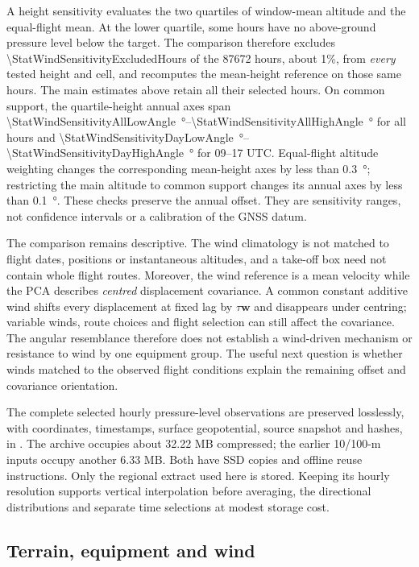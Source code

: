 A height sensitivity evaluates the two quartiles of window-mean altitude and
the equal-flight mean. At the lower quartile, some hours have no above-ground
pressure level below the target. The comparison therefore excludes
\num{\StatWindSensitivityExcludedHours} of the \num{87672} hours, about 1\%,
from \emph{every} tested height and cell, and recomputes the mean-height
reference on those same hours. The main estimates above retain all their
selected hours. On common support, the quartile-height annual axes span
\SI{\StatWindSensitivityAllLowAngle}{\degree}--\SI{\StatWindSensitivityAllHighAngle}{\degree}
for all hours and
\SI{\StatWindSensitivityDayLowAngle}{\degree}--\SI{\StatWindSensitivityDayHighAngle}{\degree}
for 09--17 UTC. Equal-flight altitude weighting changes the corresponding
mean-height axes by less than \SI{0.3}{\degree}; restricting the main altitude
to common support changes its annual axes by less than \SI{0.1}{\degree}.
These checks preserve the annual offset. They are sensitivity ranges, not
confidence intervals or a calibration of the GNSS datum.

The comparison remains descriptive. The wind climatology is not matched to
flight dates, positions or instantaneous altitudes, and a take-off box need
not contain whole flight routes. Moreover, the wind reference is a mean
velocity while the PCA describes \emph{centred} displacement covariance. A
common constant additive wind shifts every displacement at fixed lag by
$\tau\mathbf w$ and disappears under centring; variable winds, route choices
and flight selection can still affect the covariance. The angular resemblance
therefore does not establish a wind-driven mechanism or resistance to wind by
one equipment group. The useful next question is whether winds matched to
the observed flight conditions explain the remaining offset and covariance
orientation.

The complete selected hourly pressure-level observations are preserved
losslessly, with coordinates, timestamps, surface geopotential, source snapshot
and hashes, in
. The archive occupies
about 32.22 MB compressed; the earlier 10/100-m inputs occupy another 6.33 MB.
Both have SSD copies and offline reuse instructions. Only the regional extract
used here is stored. Keeping its hourly resolution supports vertical
interpolation before averaging, the directional distributions and separate
time selections at modest storage cost.
\subsection{Terrain, equipment and wind}
\label{sec:transport-kinematics}

